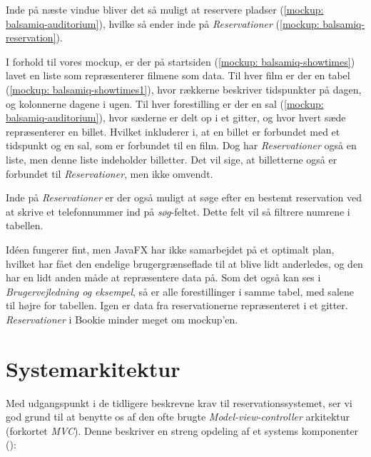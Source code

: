 Inde på næste vindue bliver det så muligt at reservere pladser (\ref{mockup: balsamiq-auditorium}), hvilke så ender inde på \textit{Reservationer} (\ref{mockup: balsamiq-reservation}).

I forhold til vores mockup, er der på startsiden (\ref{mockup: balsamiq-showtimes}) lavet en liste som repræsenterer filmene som data. Til hver film er der en tabel (\ref{mockup: balsamiq-showtimes1}), hvor rækkerne beskriver tidspunkter på dagen, og kolonnerne dagene i ugen. Til hver forestilling er der en sal (\ref{mockup: balsamiq-auditorium}), hvor sæderne er delt op i et gitter, og hvor hvert sæde repræsenterer en billet. Hvilket inkluderer i, at en billet er forbundet med et tidspunkt og en sal, som er forbundet til en film. Dog har \textit{Reservationer} også en liste, men denne liste indeholder billetter. Det vil sige, at billetterne også er forbundet til \textit{Reservationer}, men ikke omvendt.

Inde på \textit{Reservationer} er der også muligt at søge efter en bestemt reservation ved at skrive et telefonnummer ind på \textit{søg}-feltet. Dette felt vil så filtrere numrene i tabellen.

Idéen fungerer fint, men JavaFX har ikke samarbejdet på et optimalt plan, hvilket har fået den endelige brugergrænseflade til at blive lidt anderledes, og den har en lidt anden måde at repræsentere data på. Som det også kan ses i \textit{Brugervejledning og eksempel}, så er alle forestillinger i samme tabel, med salene til højre for tabellen. Igen er data fra reservationerne repræsenteret i et gitter. \textit{Reservationer} i Bookie minder meget om mockup'en.

\section{Systemarkitektur}
\label{chapter:systemarkitektur}

Med udgangspunkt i de tidligere beskrevne krav til reservationssystemet, ser vi god grund til at benytte os af den ofte brugte \textit{Model-view-controller} arkitektur (forkortet \textit{MVC}). Denne beskriver en streng opdeling af et systems komponenter (\cite{wiki:mvc}):

